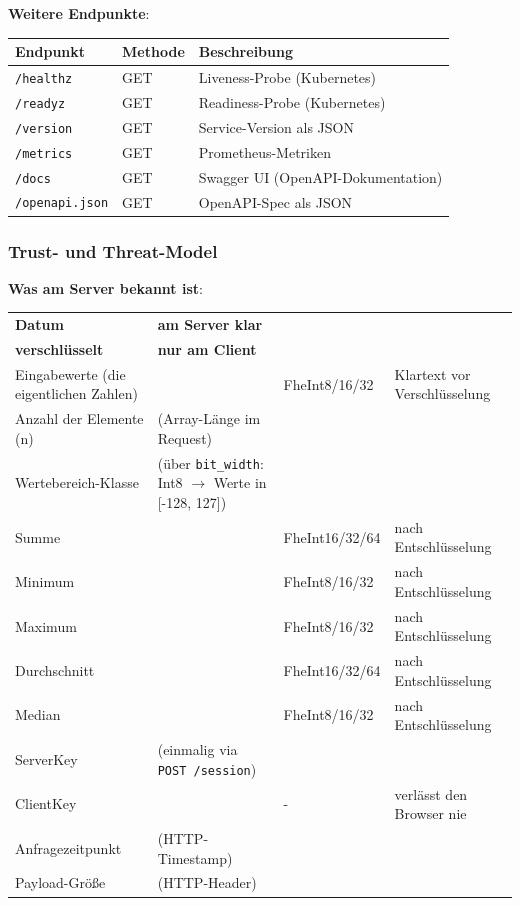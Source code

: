 \textbf{Weitere Endpunkte}:\par
\begin{tabular}{||l|l|p{9cm}||}
    \hline
    \textbf{Endpunkt} & \textbf{Methode} & \textbf{Beschreibung} \\
    \hline\hline
    \verb|/healthz| & GET & Liveness-Probe (Kubernetes) \\
    \hline
    \verb|/readyz| & GET & Readiness-Probe (Kubernetes) \\
    \hline
    \verb|/version| & GET & Service-Version als JSON \\
    \hline
    \verb|/metrics| & GET & Prometheus-Metriken \\
    \hline
    \verb|/docs| & GET & Swagger UI (OpenAPI-Dokumentation) \\
    \hline
    \verb|/openapi.json| & GET & OpenAPI-Spec als JSON \\
    \hline
\end{tabular}

\subsubsection{Trust- und Threat-Model}
\textbf{Was am Server bekannt ist}:\par
\begin{tabular}{||p{4cm}|p{4cm}|l|p{4cm}||}
    \hline
    \textbf{Datum} & \textbf{am Server klar} & \makecell{\textbf{am Server}\\\textbf{verschlüsselt}} & \textbf{nur am Client} \\
    \hline\hline
    Eingabewerte (die eigentlichen Zahlen) & \makecell{-} & FheInt8/16/32 & Klartext vor Verschlüsselung \\
    \hline
    Anzahl der Elemente (n) & (Array-Länge im Request) & \makecell{-} & \makecell{-} \\
    \hline
    Wertebereich-Klasse & (über \verb|bit_width|: Int8 $\rightarrow$ Werte in [-128, 127]) & \makecell{-} & \makecell{-} \\
    \hline
    Summe & \makecell{-} & FheInt16/32/64 & nach Entschlüsselung \\
    \hline
    Minimum & \makecell{-} & FheInt8/16/32 & nach Entschlüsselung \\
    \hline
    Maximum & \makecell{-} & FheInt8/16/32 & nach Entschlüsselung \\
    \hline
    Durchschnitt & \makecell{-} & FheInt16/32/64 & nach Entschlüsselung \\
    \hline
    Median & \makecell{-} & FheInt8/16/32 & nach Entschlüsselung \\
    \hline
    ServerKey & (einmalig via \verb|POST /session|) & \makecell{-} & \makecell{-} \\
    \hline
    ClientKey & \makecell{-} & - & verlässt den Browser nie \\
    \hline
    Anfragezeitpunkt & (HTTP-Timestamp) & \makecell{-} & \makecell{-} \\
    \hline
    Payload-Größe & (HTTP-Header) & \makecell{-} & \makecell{-} \\
    \hline
\end{tabular}

